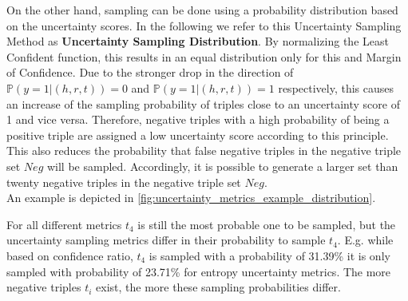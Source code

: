 On the other hand, sampling can be done using a probability distribution based on the uncertainty scores.
In the following we refer to this Uncertainty Sampling Method as \textbf{Uncertainty Sampling Distribution}.
By normalizing the Least Confident function, this results in an equal distribution only for this and Margin of Confidence.    
Due to the stronger drop in the direction of $\mathds{P}(y = 1 | (h,r,t)) = 0$ and $\mathds{P}(y = 1 | (h,r,t)) = 1$ respectively, this causes an increase of the sampling probability of triples close to an uncertainty score of 1 and vice versa.
Therefore, negative triples with a high probability of being a positive triple are assigned a low uncertainty score according to this principle.
This also reduces the probability that false negative triples in the negative triple set $Neg$ will be sampled.
Accordingly, it is possible to generate a larger set than twenty negative triples in the negative triple set $Neg$.\\
An example is depicted in \autoref{fig:uncertainty_metrics_example_distribution}.

For all different metrics $t_4$ is still the most probable one to be sampled, but the uncertainty sampling metrics differ in their probability to sample $t_4$.
E.g. while based on confidence ratio, $t_4$ is sampled with a probability of 31.39\% it is only sampled with probability of 23.71\% for entropy uncertainty metrics.
The more negative triples $t_i$ exist, the more these sampling probabilities differ.





